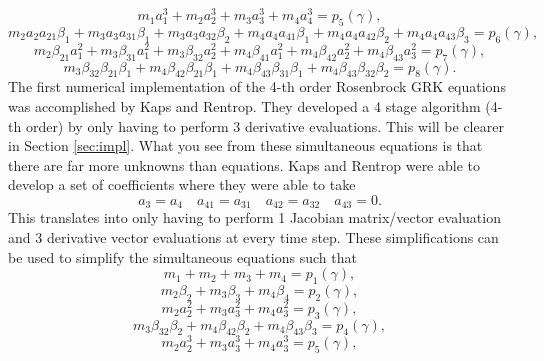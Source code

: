 \documentclass{ansconf}
\numberwithin{equation}{section}
\begin{document}
\begin{equation}
   m_1a^3_1 + m_2a^3_2 + m_3a^3_3 + m_4a^3_4 = p_5\left(\gamma\right),
\end{equation}
\begin{equation}
   m_2a_2a_{21}\beta_1 + m_3a_3a_{31}\beta_1 + m_3a_3a_{32}\beta_2 + m_4a_4a_{41}\beta_1 + m_4a_4a_{42}\beta_2 + m_4a_4a_{43}\beta_3 = p_6\left(\gamma\right),
\end{equation}
\begin{equation}
   m_2\beta_{21}a_1^2 + m_3\beta_{31}a_1^2 + m_3\beta_{32}a_2^2 + m_4\beta_{41}a_1^2 + m_4\beta_{42}a_2^2 + m_4\beta_{43}a_3^2 = p_7\left(\gamma\right),
\end{equation}
\begin{equation}
   m_3\beta_{32}\beta_{21}\beta_1 + m_4\beta_{42}\beta_{21}\beta_1 + m_4\beta_{43}\beta_{31}\beta_1 + m_4\beta_{43}\beta_{32}\beta_2 = p_8\left(\gamma\right).
\end{equation}
The first numerical implementation of the 4-th order Rosenbrock GRK equations was accomplished by Kaps and Rentrop. They developed a 4 stage algorithm (4-th order) by only having to perform 3 derivative evaluations. This will be clearer in Section \ref{sec:impl}. What you see from these simultaneous equations is that there are far more unknowns than equations. Kaps and Rentrop were able to develop a set of coefficients where they were able to take  
\begin{equation}
       a_3 = a_4 \quad a_{41} = a_{31} \quad a_{42} = a_{32} \quad a_{43} = 0.
\end{equation}
This translates into only having to perform 1 Jacobian matrix/vector evaluation and 3 derivative vector evaluations at every time step. These simplifications can be used to simplify the simultaneous equations such that
\begin{equation}
   m_1 + m_2 + m_3 + m_4 = p_1\left(\gamma\right),
\end{equation}
\begin{equation}
   m_2\beta_2 + m_3\beta_3 + m_4\beta_4 = p_2\left(\gamma\right),
\end{equation}
\begin{equation}
   m_2a^2_2 + m_3a^2_3 + m_4a^2_3 = p_3\left(\gamma\right),
\end{equation}
\begin{equation}
   m_3\beta_{32}\beta_2 + m_4\beta_{42}\beta_2 + m_4\beta_{43}\beta_3 = p_4\left(\gamma\right),
\end{equation}
\begin{equation}
   m_2a^3_2 + m_3a^3_3 + m_4a^3_3 = p_5\left(\gamma\right),
\end{equation}
\end{document}
